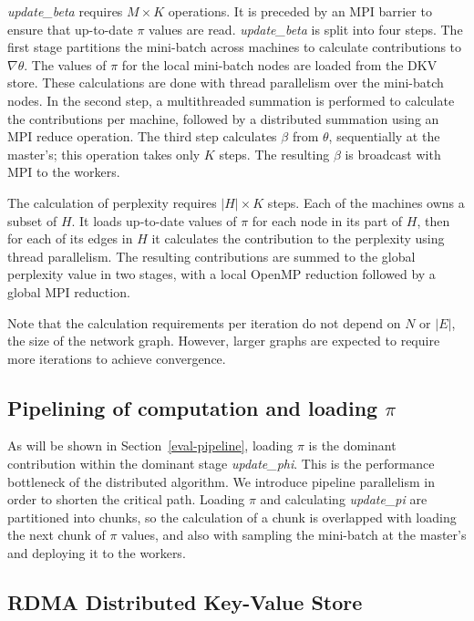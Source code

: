 \textit{update\_beta} requires $M\times K$ operations. It is preceded by an MPI
barrier to ensure that up-to-date $\pi$ values are read. \textit{update\_beta}
is split into four steps. The first stage partitions the mini-batch across
machines to calculate contributions to $\nabla\theta$. The values of $\pi$ for
the local mini-batch nodes are loaded from the DKV store. These calculations
are done with thread parallelism over the mini-batch nodes. In the second step,
a multithreaded summation is performed to calculate the contributions per
machine, followed by a distributed summation using an MPI reduce operation. The
third step calculates $\beta$ from $\theta$, sequentially at the master's; this
operation takes only $K$ steps. The resulting $\beta$ is broadcast with MPI
to the workers.

The calculation of perplexity requires $|H|\times K$ steps. Each of the
machines owns a subset of $H$. It loads up-to-date values of $\pi$ for each
node in its part of $H$, then for each of its edges in $H$ it calculates the
contribution to the perplexity using thread parallelism. The resulting
contributions are summed to the global perplexity value in two stages,
with a local OpenMP reduction followed by a global MPI reduction.

Note that the calculation requirements per iteration do not depend
on $N$ or $|E|$, the size of the network graph. However, larger graphs are
expected to require more iterations to achieve convergence.

\subsection{Pipelining of computation and loading $\pi$}

As will be shown in Section~\ref{eval-pipeline}, loading $\pi$ is the
dominant contribution within the dominant stage \textit{update\_phi}. This
is the performance bottleneck of the distributed algorithm. We introduce
pipeline parallelism in order to shorten the critical path. Loading $\pi$
and calculating \textit{update\_pi} are partitioned into chunks, so the
calculation of a chunk is overlapped with loading the next chunk of $\pi$
values, and also with sampling the mini-batch at the master's and deploying
it to the workers.

\subsection{RDMA Distributed Key-Value Store}

